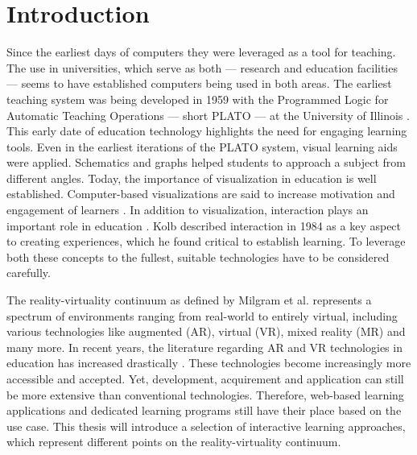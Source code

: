 %





\chapter{Introduction}
\label{sec:intro}


Since the earliest days of computers they were leveraged as a tool for teaching. The use in universities, which serve as both --- research and education facilities --- seems to have established computers being used in both areas. The earliest teaching system was being developed in 1959 with the Programmed Logic for Automatic Teaching Operations --- short PLATO --- at the University of Illinois \cite{cope2023history}. This early date of education technology highlights the need for engaging learning tools. Even in the earliest iterations of the PLATO system, visual learning aids were applied. Schematics and graphs helped students to approach a subject from different angles. Today, the importance of visualization in education is well established. Computer-based visualizations are said to increase motivation and engagement of learners \cite{vavra2011visualization}. In addition to visualization, interaction plays an important role in education \cite{firat2018towards}. Kolb described interaction in 1984 \cite{kolb:1984:experiential} as a key aspect to creating experiences, which he found critical to establish learning. To leverage both these concepts to the fullest, suitable technologies have to be considered carefully.

The reality-virtuality continuum as defined by Milgram et al. \cite{milgram1994arc} represents a spectrum of environments ranging from real-world to entirely virtual, including various technologies like augmented (AR), virtual (VR), mixed reality (MR) and many more. In recent years, the literature regarding AR and VR technologies in education has increased drastically \cite{alansi2023analyzing}. These technologies become increasingly more accessible and accepted. Yet, development, acquirement and application can still be more extensive than conventional technologies. Therefore, web-based learning applications and dedicated learning programs still have their place based on the use case. This thesis will introduce a selection of interactive learning approaches, which represent different points on the reality-virtuality continuum. 

